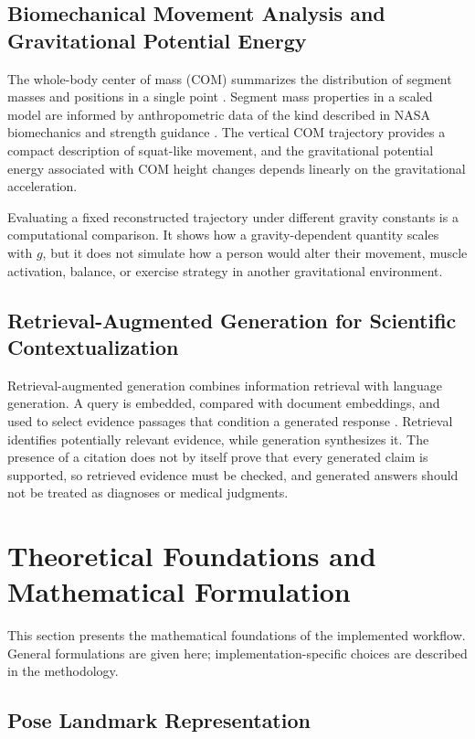 \documentclass[11pt,a4paper]{article}
\begin{document}
\subsection{Biomechanical Movement Analysis and Gravitational Potential Energy}

The whole-body center of mass (COM) summarizes the distribution of segment masses and positions in a single point \cite{featherstone2008}. Segment mass properties in a scaled model are informed by anthropometric data of the kind described in NASA biomechanics and strength guidance \cite{ochmo_biomech}. The vertical COM trajectory provides a compact description of squat-like movement, and the gravitational potential energy associated with COM height changes depends linearly on the gravitational acceleration.

Evaluating a fixed reconstructed trajectory under different gravity constants is a computational comparison. It shows how a gravity-dependent quantity scales with $g$, but it does not simulate how a person would alter their movement, muscle activation, balance, or exercise strategy in another gravitational environment.

\subsection{Retrieval-Augmented Generation for Scientific Contextualization}

Retrieval-augmented generation combines information retrieval with language generation. A query is embedded, compared with document embeddings, and used to select evidence passages that condition a generated response \cite{lewis2020rag}. Retrieval identifies potentially relevant evidence, while generation synthesizes it. The presence of a citation does not by itself prove that every generated claim is supported, so retrieved evidence must be checked, and generated answers should not be treated as diagnoses or medical judgments.

\section{Theoretical Foundations and Mathematical Formulation}

This section presents the mathematical foundations of the implemented workflow. General formulations are given here; implementation-specific choices are described in the methodology.

\subsection{Pose Landmark Representation}
\end{document}
